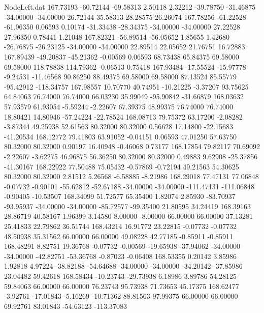 \begin{filecontents}{NodeLeft.dat}
 167.73193  -60.72144  -69.58313     2.50118    2.32212  -39.78750  -31.46875  -34.00000  -34.00000   26.72144   35.58313   28.28575   26.26074
 167.78256  -61.22528  -61.96350     0.06593    0.10174  -31.33438  -28.34375  -34.00000  -34.00000   27.22528   27.96350    0.78441    1.21048
 167.82321  -56.89514  -56.05652     1.85655    1.42680  -26.76875  -26.23125  -34.00000  -34.00000   22.89514   22.05652   21.76751   16.72883
 167.89439  -49.20837  -45.21362    -0.00569    0.06593   68.73438   65.84375   69.58000   69.58000  118.78838  114.79362   -0.06513    0.75418
 167.93484  -17.55524  -15.97778    -9.24531  -11.46568   90.86250   88.49375   69.58000   69.58000   87.13524   85.55779  -95.42912 -118.34757
 167.98557   10.70770   40.74951   -10.21225   -3.37207   93.75625   64.84063   76.74000   76.74000   66.03230   35.99049  -95.90842  -31.66879
 168.03632   57.93579   61.93054    -5.59244   -2.22607   67.39375   48.99375   76.74000   76.74000   18.80421   14.80946  -57.24224  -22.78524
 168.08713   79.75372   63.17200    -2.08282   -3.87344   49.25938   52.61563   80.32000   80.32000    0.56628   17.14800  -22.15683  -41.20534
 168.12772   79.41803   63.91052    -0.04151    0.06593   47.01250   57.63750   80.32000   80.32000    0.90197   16.40948   -0.46068    0.73177
 168.17854   79.82117   70.69092    -2.22607   -3.62275   46.96875   56.36250   80.32000   80.32000    0.49883    9.62908  -25.37856  -41.30167
 168.22922   77.50488   75.05432    -0.57869   -0.72194   49.21563   54.30625   80.32000   80.32000    2.81512    5.26568   -6.58885   -8.21986
 168.29018   77.47131   77.06848    -0.07732   -0.90101  -55.62812  -52.67188  -34.00000  -34.00000 -111.47131 -111.06848   -0.90405  -10.53507
 168.34099   51.72577   65.35400     1.82074    2.85930  -83.70937  -93.95937  -34.00000  -34.00000  -85.72577  -99.35400   21.80595   34.24419
 168.39163   28.86719   40.58167     1.96399    3.14580    8.00000   -8.00000   66.00000   66.00000   37.13281   25.41833   22.79862   36.51744
 168.43214   16.91772   23.22815    -0.07732   -0.07732   48.50938   35.31562   66.00000   66.00000   49.08228   42.77185   -0.85911   -0.85911
 168.48291    8.82751   19.36768    -0.07732   -0.00569  -19.65938  -37.94062  -34.00000  -34.00000  -42.82751  -53.36768   -0.87023   -0.06408
 168.53355    0.20142    3.85986     1.92818    4.97224  -38.82188  -54.64688  -34.00000  -34.00000  -34.20142  -37.85986   23.04482   59.42618
 168.58434  -10.23743  -29.73938     6.18986    3.89786   54.28125   59.84063   66.00000   66.00000   76.23743   95.73938   71.73653   45.17375
 168.62477   -3.92761  -17.01843    -5.16269  -10.71362   88.81563   97.99375   66.00000   66.00000   69.92761   83.01843  -54.63123 -113.37083

\end{filecontents}
